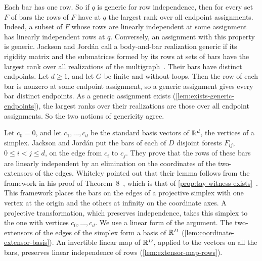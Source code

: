 Each bar has one row. So if $q$ is generic for row independence, then
for every set $F$ of bars the rows of $F$ have at $q$ the largest rank
over all endpoint assignments. Indeed, a subset of $F$ whose rows are
linearly independent at some assignment has linearly independent rows
at $q$. Conversely, an assignment with this property is generic.
Jackson and Jord\'an call a body-and-bar realization generic if its
rigidity matrix and the submatrices formed by its rows at sets of bars
have the largest rank over all realizations of the
multigraph~\cite[\S5]{jacksonJordan2009}. Their bars have distinct
endpoints. Let $d \ge 1$, and let $G$ be finite and without loops.
Then the row of each bar is nonzero at some endpoint assignment, so a
generic assignment gives every bar distinct endpoints. As a generic
assignment exists (\cref{lem:exists-generic-endpoints}), the largest
ranks over their realizations are those over all endpoint assignments.
So the two notions of genericity agree.

Let $c_0 = 0$, and let $c_1, \dots, c_d$ be the standard basis vectors
of ${\mathbb{R}}^d$, the vertices of a simplex. Jackson and Jord\'an put the
bars of each of $D$ disjoint forests $F_{ij}$, $0 \le i < j \le d$, on
the edge from $c_i$ to $c_j$. They prove that the rows of these bars
are linearly independent by an elimination on the coordinates of the
two-extensors of the edges. Whiteley pointed out that their lemma
follows from the framework in his proof of
Theorem~8~\cite{whiteley1988}, which is that of
\cref{prop:tay-witness-exists}~\cite[Remark after
Lemma~5.1]{jacksonJordan2009}. This framework places the bars on the
edges of a projective simplex with one vertex at the origin and the
others at infinity on the coordinate axes. A projective
transformation, which preserves independence, takes this simplex to
the one with vertices $c_0, \dots, c_d$. We use a linear form of the
argument. The two-extensors of the edges of the simplex form a basis
of ${\mathbb{R}}^D$ (\cref{lem:coordinate-extensor-basis}). An invertible linear
map of ${\mathbb{R}}^D$, applied to the vectors on all the bars, preserves
linear independence of rows (\cref{lem:extensor-map-rows}).

